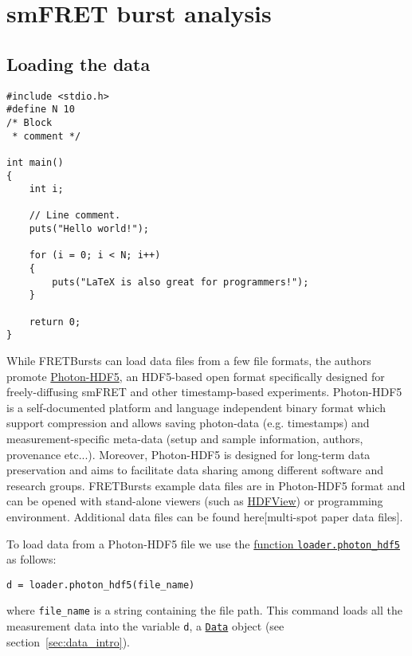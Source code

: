 \section{smFRET burst analysis}
\label{sec:analysis}

\subsection{Loading the data}
\label{sec:dataload}
\lstset{language=c}
\begin{lstlisting}
#include <stdio.h>
#define N 10
/* Block
 * comment */

int main()
{
    int i;

    // Line comment.
    puts("Hello world!");
    
    for (i = 0; i < N; i++)
    {
        puts("LaTeX is also great for programmers!");
    }

    return 0;
}
\end{lstlisting}
While FRETBursts can load data files from a few file formats,
the authors promote \href{http://photon-hdf5.readthedocs.org/}{Photon-HDF5},
an HDF5-based open format specifically designed for freely-diffusing smFRET and other timestamp-based experiments.
Photon-HDF5 is a self-documented platform and language independent binary format
which support compression and allows saving photon-data (e.g. timestamps) and measurement-specific meta-data
(setup and sample information, authors, provenance etc...).
Moreover, Photon-HDF5 is designed for long-term data preservation and aims to facilitate data sharing
among different software and research groups.
FRETBursts example data files are in Photon-HDF5 format and can be opened with
stand-alone viewers (such as \href{http://www.hdfgroup.org/products/java/hdfview/}{HDFView}) or 
programming environment.
Additional data files can be found here[multi-spot paper data files].

To load data from a Photon-HDF5 file we use the
\href{http://fretbursts.readthedocs.org/en/latest/loader.html#fretbursts.loader.photon_hdf5}{function \texttt{loader.photon\_hdf5}} as follows:

\begin{lstlisting}
d = loader.photon_hdf5(file_name)
\end{lstlisting}

\noindent
where \verb|file_name| is a string containing the file path.
This command loads all the measurement data into the variable \verb|d|,
a \href{http://fretbursts.readthedocs.org/en/latest/data_class.html}{\texttt{Data}} object
(see section~\ref{sec:data_intro}).

